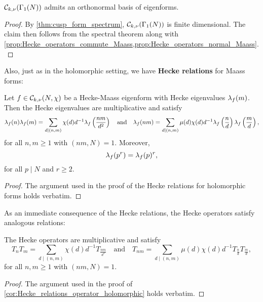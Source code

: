     \begin{theorem}\label{thm:eigenforms_forms_spectral_theory_Maass}
      $\mathcal{C}_{k,\nu}(\Gamma_{1}(N))$ admits an orthonormal basis of eigenforms.
    \end{theorem}
    \begin{proof}
      By \cref{thm:cusp_form_spectrum}, $\mathcal{C}_{k,\nu}(\Gamma_{1}(N))$ is finite dimensional. The claim then follows from the spectral theorem along with \cref{prop:Hecke_operators_commute_Maass,prop:Hecke_operators_normal_Maass}.
    \end{proof}

    Also, just as in the holomorphic setting, we have \textbf{Hecke relations} for Maass forms:

    \begin{proposition}
      Let $f \in \mathcal{C}_{k,\nu}(N,\chi)$ be a Hecke-Maass eigenform with Hecke eigenvalues $\lambda_{f}(m)$. Then the Hecke eigenvalues are multiplicative and satisfy
      \[
        \lambda_{f}(n)\lambda_{f}(m) = \sum_{d \mid (n,m)}\chi(d)d^{-1}\lambda_{f}\left(\frac{nm}{d^{2}}\right) \quad \text{and} \quad \lambda_{f}(nm) = \sum_{d \mid (n,m)}\mu(d)\chi(d)d^{-1}\lambda_{f}\left(\frac{n}{d}\right)\lambda_{f}\left(\frac{m}{d}\right),
      \]
      for all $n,m \ge 1$ with $(nm,N) = 1$. Moreover,
      \[
        \lambda_{f}(p^{r}) = \lambda_{f}(p)^{r},
      \]
      for all $p \mid N$ and $r \ge 2$.
    \end{proposition}
    \begin{proof}
      The argument used in the proof of the Hecke relations for holomorphic forms holds verbatim.
    \end{proof}
    
    As an immediate consequence of the Hecke relations, the Hecke operators satisfy analogous relations:

    \begin{corollary}\label{cor:Hecke_relations_operator_Maass}
      The Hecke operators are multiplicative and satisfy
      \[
        T_{n}T_{m} = \sum_{d \mid (n,m)}\chi(d)d^{-1}T_{\frac{nm}{d^{2}}} \quad \text{and} \quad T_{nm} = \sum_{d \mid (n,m)}\mu(d)\chi(d)d^{-1}T_{\frac{n}{d}}T_{\frac{m}{d}},
      \]
      for all $n,m \ge 1$ with $(nm,N) = 1$.
    \end{corollary}
    \begin{proof}
      The argument used in the proof of \cref{cor:Hecke_relations_operator_holomorphic} holds verbatim.
    \end{proof}


